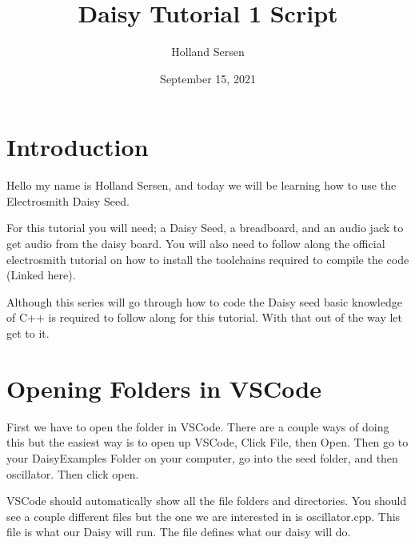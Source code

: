 \documentclass[12pt]{article}
\begin{document}
\title{Daisy Tutorial 1 Script}
\author{Holland Sersen}
\date{September 15, 2021}
\maketitle

\newpage
\tableofcontents


\pagebreak
\section{Introduction}

Hello my name is Holland Sersen, and today we will be learning how to use the Electrosmith Daisy Seed.

For this tutorial you will need; a Daisy Seed, a breadboard, and an audio jack to get audio from the daisy board. You will also need to follow along the official electrosmith tutorial on how to install the toolchains required to compile the code (Linked here).\

Although this series will go through how to code the Daisy seed basic knowledge of C++ is required to follow along for this tutorial. With that out of the way let get to it.

\section{Opening Folders in VSCode}

First we have to open the folder in VSCode. There are a couple ways of doing this but the easiest way is to open up VSCode, Click File, then Open. Then go to your DaisyExamples Folder on your computer, go into the seed folder, and then oscillator. Then click open.

VSCode should automatically show all the file folders and directories. You should see a couple different files but the one we are interested in is oscillator.cpp. This file is what our Daisy will run. The file defines what our daisy will do.
\end{document}
